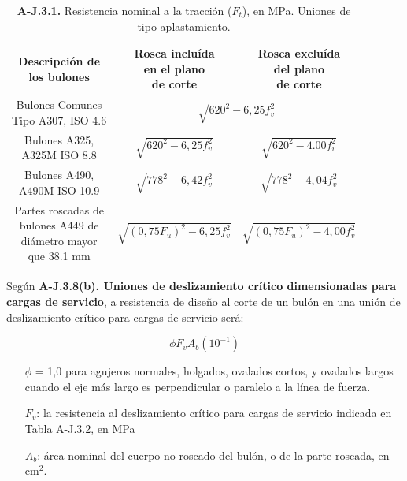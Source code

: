 \documentclass[twocolumn]{article}
\begin{document}
\begin{table}[htb!]
	\centering
	\caption{\textbf{A-J.3.1.} Resistencia nominal a la tracción ($F_t$), en MPa. Uniones de tipo aplastamiento.}
	\begin{tabular}{|c|c|c|}
		\hline 
		\thead{Descripción de \\ los bulones} & \thead{Rosca incluída\\ en el
		plano\\ de corte} & \thead{Rosca excluída \\ del
		plano\\ de corte} \\ 
		\hline 
		\thead{Bulones Comunes\\
		Tipo A307, ISO 4.6} & \multicolumn{2}{c|}{$\sqrt{620^{2}-6,25 f_{v}^{2}}$} \\ 
		\hline 
		\thead{Bulones
		A325,\\ A325M
		ISO 8.8} & $\sqrt{620^{2}-6,25 f_{v}^{2}}$ & $\sqrt{620^{2}-4.00f_{v}^{2}}$ \\ 
		\hline 
		\thead{Bulones
		A490,\\ A490M
		ISO 10.9} & $\sqrt{778^{2}-6,42 f_{v}^{2}}$ & $\sqrt{778^{2}- 4,04 f_{v}^{2}}$ \\ 
		\hline 
		\thead{Partes roscadas de\\
		bulones A449 de\\
		diámetro mayor\\ que
		38.1 mm} & $\sqrt{(0,75F_u)^{2}-6,25 f_{v}^{2}}$ & $\sqrt{(0,75F_u)^{2}-4,00 f_{v}^{2}}$ \\ 
		\hline 
	\end{tabular} 
\end{table}

Según \textbf{A-J.3.8(b). Uniones de deslizamiento crítico dimensionadas para cargas de servicio}, a resistencia de diseño al corte de un bulón en una unión de deslizamiento crítico para cargas de servicio será:

\[
\phi F_v A_b (10^{-1})
\]
\begin{itemize}
	\item[$\phi$] = 1,0  para agujeros normales, holgados, ovalados cortos, y ovalados largos	cuando el eje más largo es perpendicular o paralelo a la línea de fuerza.
	\item[$F_v$:] la resistencia al deslizamiento crítico para cargas de servicio indicada en 
	Tabla A-J.3.2, en MPa
	\item[$A_b$:] área nominal del cuerpo no roscado del bulón, o de la parte roscada, en cm$^2$. 
\end{itemize}
\end{document}
